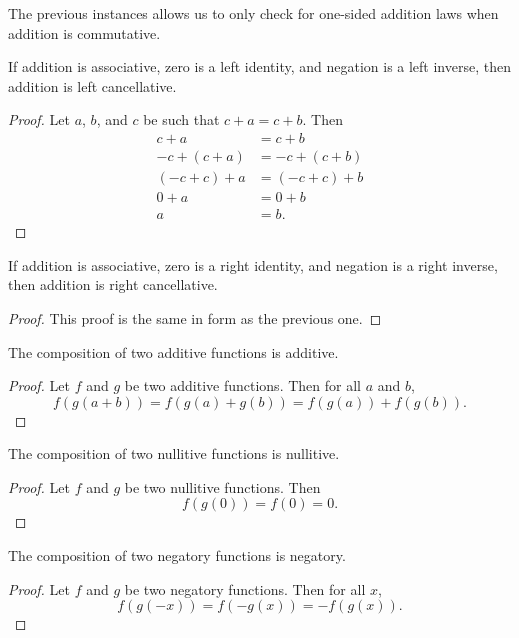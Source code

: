 \documentclass[../../math.tex]{subfiles}
\begin{document}
The previous instances allows us to only check for one-sided addition laws when
addition is commutative.

\begin{instance} \label{plus_linv_lcancel}
    If addition is associative, zero is a left identity, and negation is a left
    inverse, then addition is left cancellative.
\end{instance}
\begin{proof}
    Let $a$, $b$, and $c$ be such that $c + a = c + b$.  Then
    \begin{align*}
        c + a &= c + b \\
        -c + (c + a) &= -c + (c + b) \\
        (-c + c) + a &= (-c + c) + b \\
        0 + a &= 0 + b \\
        a &= b.
    \end{align*}
\end{proof}

\begin{instance} \label{plus_rinv_rcancel}
    If addition is associative, zero is a right identity, and negation is a
    right inverse, then addition is right cancellative.
\end{instance}
\begin{proof}
    This proof is the same in form as the previous one.
\end{proof}

\begin{instance}
    The composition of two additive functions is additive.
\end{instance}
\begin{proof}
    Let $f$ and $g$ be two additive functions.  Then for all $a$ and $b$,
    \[
        f(g(a + b)) = f(g(a) + g(b)) = f(g(a)) + f(g(b)).
    \]
\end{proof}

\begin{instance}
    The composition of two nullitive functions is nullitive.
\end{instance}
\begin{proof}
    Let $f$ and $g$ be two nullitive functions.  Then
    \[
        f(g(0)) = f(0) = 0.
    \]
\end{proof}

\begin{instance}
    The composition of two negatory functions is negatory.
\end{instance}
\begin{proof}
    Let $f$ and $g$ be two negatory functions.  Then for all $x$,
    \[
        f(g(-x)) = f(-g(x)) = -f(g(x)).
    \]
\end{proof}
\end{document}
